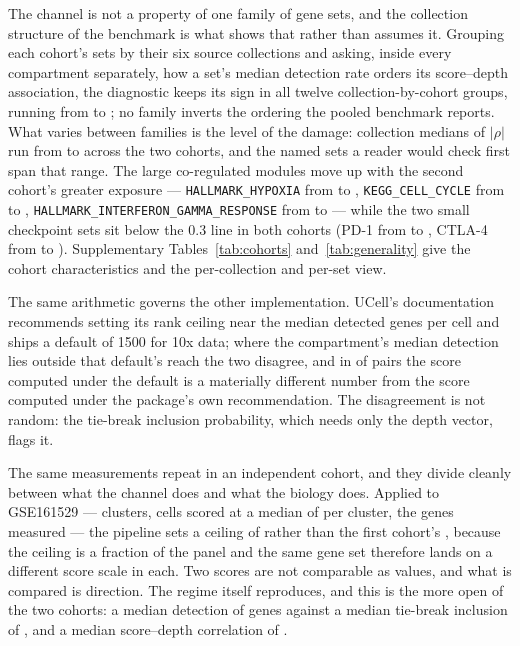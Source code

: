 \documentclass[11pt]{article}
\newcommand{\code}[1]{\texttt{#1}}
\begin{document}
The channel is not a property of one family of gene sets, and the collection
structure of the benchmark is what shows that rather than assumes it. Grouping
each cohort's sets by their six source collections and asking, inside every
compartment separately, how a set's median detection rate orders its
score--depth association, the diagnostic keeps its sign in all twelve
collection-by-cohort groups, running from \genDiagMin{} to \genDiagMax; no
family inverts the ordering the pooled benchmark reports. What varies between
families is the level of the damage: collection medians of $|\rho|$ run from
\genAbsMin{} to \genAbsMax{} across the two cohorts, and the named sets a
reader would check first span that range. The large co-regulated modules move
up with the second cohort's greater exposure --- \code{HALLMARK\_HYPOXIA} from
\genHypoxiaRho{} to \genHypoxiaSecond, \code{KEGG\_CELL\_CYCLE} from
\genCellCycleRho{} to \genCellCycleSecond, \code{HALLMARK\_INTERFERON\_GAMMA\_RESPONSE}
from \genIfNgRho{} to \genIfNgSecond --- while the two small checkpoint sets sit
below the 0.3 line in both cohorts (PD-1 from \genPdOneRho{} to
\genPdOneSecond, CTLA-4 from \genCtlaFourRho{} to \genCtlaFourSecond).
Supplementary Tables~\ref{tab:cohorts} and~\ref{tab:generality} give the
cohort characteristics and the per-collection and per-set view.

The same arithmetic governs the other implementation. UCell's documentation
recommends setting its rank ceiling near the median detected genes per cell and
ships a default of 1500 for 10x data; where the compartment's median detection
lies outside that default's reach the two disagree, and in
\benchUcellBelow{} of pairs the score computed under the default is a
materially different number from the score computed under the package's own
recommendation. The disagreement is not random: the tie-break inclusion
probability, which needs only the depth vector, flags it.

The same measurements repeat in an independent cohort, and they divide cleanly
between what the channel does and what the biology does. Applied to GSE161529
\citep{pal2021} --- \benchCohortGroups{} clusters, \benchCohortCells{} cells
scored at a median of \benchCohortMedianCells{} per cluster, the
\benchCohortGenes{} genes measured --- the pipeline sets a ceiling of
\benchCohortMaxRank{} rather than the first cohort's \benchMaxRank, because the
ceiling is a fraction of the panel and the same gene set therefore lands on a
different score scale in each. Two scores are not comparable as values, and what
is compared is direction. The regime itself reproduces, and this is the more
open of the two cohorts: a median detection of \benchCohortDetected{} genes
against a median tie-break inclusion of \benchCohortInclusion, and a median
score--depth correlation of \benchCohortRhoDepth.
\end{document}
